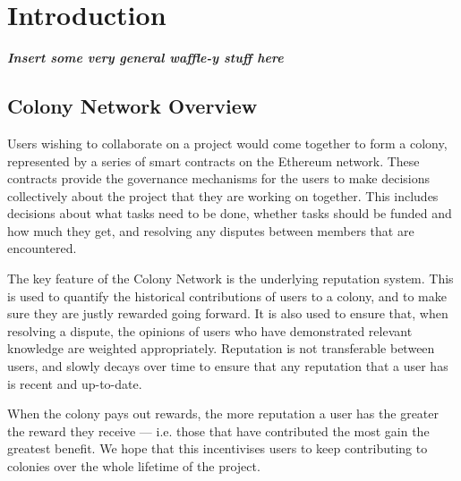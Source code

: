 \section{Introduction}


\textbf{\emph{Insert some very general waffle-y stuff here}}

\subsection{Colony Network Overview}

Users wishing to collaborate on a project would come together to form a colony, represented by a series of smart contracts on the Ethereum network. These contracts provide the governance mechanisms for the users to make decisions collectively about the project that they are working on together. This includes decisions about what tasks need to be done, whether tasks should be funded and how much they get, and resolving any disputes between members that are encountered.

The key feature of the Colony Network is the underlying reputation system. This is used to quantify the historical contributions of users to a colony, and to make sure they are justly rewarded going forward. It is also used to ensure that, when resolving a dispute, the opinions of users who have demonstrated relevant knowledge are weighted appropriately. Reputation is not transferable between users, and slowly decays over time to ensure that any reputation that a user has is recent and up-to-date.

When the colony pays out rewards, the more reputation a user has the greater the reward they receive --- i.e. those that have contributed the most gain the greatest benefit. We hope that this incentivises users to keep contributing to colonies over the whole lifetime of the project.
